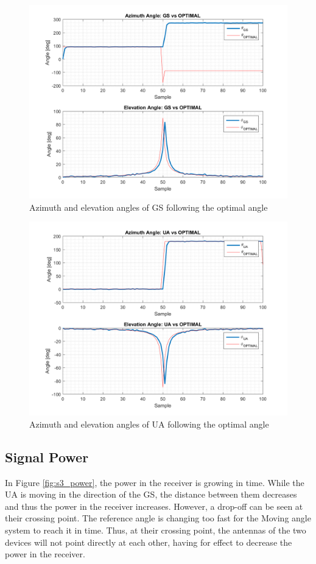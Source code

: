 \begin{figure}[H]
	\centering
	\includegraphics[scale=0.8]{figures/s3_gs.png}
	\caption{Azimuth and elevation angles of GS following the optimal angle}
	\label{fig:s3_gs}
\end{figure}

\begin{figure}[H]
	\centering
	\includegraphics[scale=0.8]{figures/s3_ua.png}
	\caption{Azimuth and elevation angles of UA following the optimal angle}
	\label{fig:s3_ua}
\end{figure}

\subsection*{Signal Power}
In Figure \ref{fig:s3_power}, the power in the receiver is growing in time. While the UA is moving in the direction of the GS, the distance between them decreases and thus the power in the receiver increases. However, a drop-off can be seen at their crossing point. The reference angle is changing too fast for the Moving angle system to reach it in time. Thus, at their crossing point, the antennas of the two devices will not point directly at each other, having for effect to decrease the power in the receiver.

